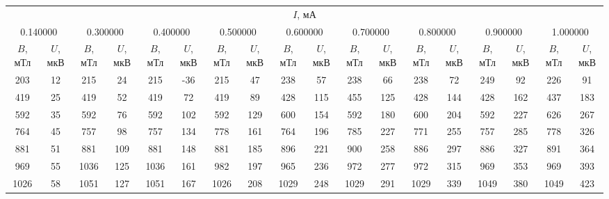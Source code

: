 \begin{tabular}{cccccccccccccccccc}
\toprule
\multicolumn{18}{c}{$I$, мА} \\
\multicolumn{2}{c}{0.140000} & \multicolumn{2}{c}{0.300000} & \multicolumn{2}{c}{0.400000} & \multicolumn{2}{c}{0.500000} & \multicolumn{2}{c}{0.600000} & \multicolumn{2}{c}{0.700000} & \multicolumn{2}{c}{0.800000} & \multicolumn{2}{c}{0.900000} & \multicolumn{2}{c}{1.000000} \\
$B$, мТл & $U$, мкВ & $B$, мТл & $U$, мкВ & $B$, мТл & $U$, мкВ & $B$, мТл & $U$, мкВ & $B$, мТл & $U$, мкВ & $B$, мТл & $U$, мкВ & $B$, мТл & $U$, мкВ & $B$, мТл & $U$, мкВ & $B$, мТл & $U$, мкВ \\
\midrule
203 & 12 & 215 & 24 & 215 & -36 & 215 & 47 & 238 & 57 & 238 & 66 & 238 & 72 & 249 & 92 & 226 & 91 \\
419 & 25 & 419 & 52 & 419 & 72 & 419 & 89 & 428 & 115 & 455 & 125 & 428 & 144 & 428 & 162 & 437 & 183 \\
592 & 35 & 592 & 76 & 592 & 102 & 592 & 129 & 600 & 154 & 592 & 180 & 600 & 204 & 592 & 227 & 626 & 267 \\
764 & 45 & 757 & 98 & 757 & 134 & 778 & 161 & 764 & 196 & 785 & 227 & 771 & 255 & 757 & 285 & 778 & 326 \\
881 & 51 & 881 & 109 & 881 & 148 & 881 & 185 & 896 & 221 & 900 & 258 & 886 & 297 & 886 & 327 & 891 & 364 \\
969 & 55 & 1036 & 125 & 1036 & 161 & 982 & 197 & 965 & 236 & 972 & 277 & 972 & 315 & 969 & 353 & 969 & 393 \\
1026 & 58 & 1051 & 127 & 1051 & 167 & 1026 & 208 & 1029 & 248 & 1029 & 291 & 1029 & 339 & 1049 & 380 & 1049 & 423 \\
\bottomrule
\end{tabular}
